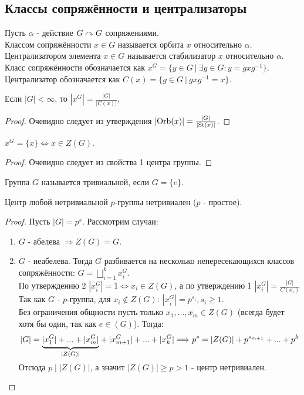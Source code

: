 \subsection{Классы сопряжённости и централизаторы}
\begin{definition}
    Пусть $\alpha$ - действие $G \curvearrowright G$ сопряжениями.\\
    Классом сопряжённости $x \in G$ называется орбита $x$ относительно $\alpha$.\\
    Централизатором элемента $x \in G$ называется стабилизатор $x$ относительно $\alpha$.\\
    Класс сопряжённости обозначается как $x^G = \{y \in G \ | \ \exists g \in G: y = gxg^{-1}\}$.
    Централизатор обозначается как $C(x) = \{g \in G \ |\ gxg^{-1} = x\}$.
\end{definition}
\begin{subtheoremnum}
    Если $|G| < \infty$, то $|x^{G}| = \frac{|G|}{|C(x)|}$.
\end{subtheoremnum}
\begin{proof}
    Очевидно следует из утверждения $|\textup{Orb}(x)| = \frac{|G|}{|\textup{St}(x)|}$.
\end{proof}
\begin{subtheoremnum}
    $x^G = \{x\} \Longleftrightarrow x \in Z(G)$.
\end{subtheoremnum}
\begin{proof}
    Очевидно следует из свойства 1 центра группы.
\end{proof}
\begin{definition}
    Группа $G$ называется тривиальной, если $G = \{e\}$.
\end{definition}
\begin{theorem}
    Центр любой нетривиальной $p$-группы нетривиален ($p$ - простое).
\end{theorem}
\begin{proof}
    Пусть $|G| = p^s$. Рассмотрим случаи:
    \begin{enumerate}
        \item $G$ - абелева $\Longrightarrow Z(G) = G$.
        \item $G$ - неабелева. Тогда $G$ разбивается на несколько непересекающихся классов сопряжённости: $G = \bigsqcup \limits_{i=1}^k x_i^G$.\\
        По утверждению 2 $|x_i^G| = 1 \Longleftrightarrow x_i \in Z(G)$, а по утверждению 1 $|x_i^G| = \frac{|G|}{C(x_i)}$\\
        Так как $G$ - $p$-группа, для $x_i \notin Z(G): \  |x_i^G| = p^{s_i}, s_i \geqslant 1$.\\
        Без ограничения общности пусть только $x_1,...,x_m \in Z(G)$ (всегда будет хотя бы один, так как $e \in (G)$). Тогда: 
        \[|G| = \undermat{|Z(G)|}{|x_1^G| + ... + |x_m^G|} + |x_{m+1}^G| + ... + |x_k^G| \Longrightarrow p^s = |Z(G)| + p^{s_{m+1}} + ... + p^{k}\]
        \\
        Отсюда $p \mid |Z(G)|$, а значит $|Z(G)| \geqslant p > 1$ - центр нетривиален.
    \end{enumerate}
\end{proof}
